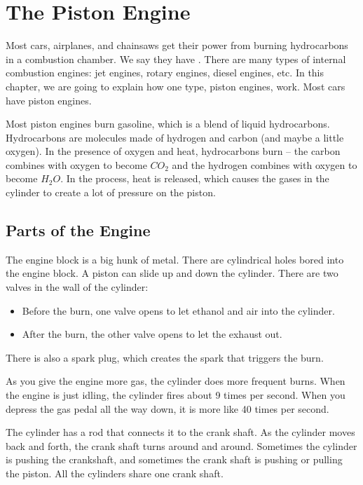 \chapter{The Piston Engine}

Most cars,  airplanes,  and chainsaws get their power from burning hydrocarbons in a 
combustion chamber.   We say they have .   There are many types of internal combustion engines: jet engines, rotary engines, diesel engines, etc.  In this chapter, we are 
going to explain how one type,  piston engines, work.   Most cars have piston engines.

Most piston engines burn gasoline,  which is a blend of liquid hydrocarbons.  Hydrocarbons are molecules made of hydrogen and carbon (and maybe a little oxygen).  In the presence of oxygen and heat,  hydrocarbons burn -- the carbon combines with oxygen to become $CO_2$ and the hydrogen combines with oxygen to become $H_2O$.  In the process,   heat is released,  which causes the gases in the cylinder to create a lot of pressure on the piston.


\section{Parts of the Engine}

The engine block is a big hunk of metal.  There are cylindrical holes bored into the engine block.  A piston can slide up and down the cylinder.  There are two valves in the wall of the cylinder:  
\begin{itemize}
\item Before the burn, one valve opens to let ethanol and air into the cylinder.
\item After the burn,  the other valve opens to let the exhaust out.
\end{itemize}

There is also a spark plug,   which creates the spark that triggers the burn.

As you give the engine more gas,  the cylinder does more frequent burns.  When the engine is just idling,  the cylinder fires about 9 times per second.  When you depress the gas pedal all the way down,  it is more like 40 times per second.

The cylinder has a rod that connects it to the crank shaft.   As the cylinder moves back and forth,  the crank shaft turns around and around.  Sometimes the cylinder is pushing the crankshaft, and sometimes the crank shaft is pushing or pulling the piston.  All the cylinders share one crank shaft.

